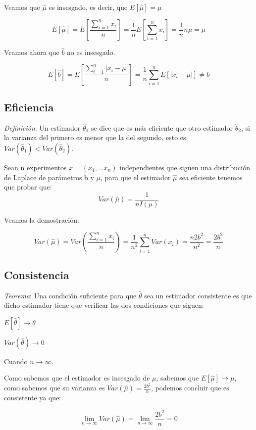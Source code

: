 \documentclass[a4paper, 10pt]{article} %
\begin{document}
Veamos que $\hat{\mu}$ es insesgado, es decir, que  $E\left[\hat{\mu}\right]=\mu$

$$E\left[\hat{\mu}\right] = E\left[\frac{\sum_{i=1}^{n}x_i}{n}\right] = \frac{1}{n}E\left[\sum_{i=1}^{n}x_i\right] = \frac{1}{n}n\mu = \mu $$

Veamos ahora que $\hat{b}$ no es insesgado. 

$$E\left[\hat{b}\right] = E\left[\frac{\sum_{i=1}^{n}|x_i - \mu|}{n}\right] = \frac{1}{n}\sum_{i=1}^{n}E\left[|x_i - \mu|\right] \neq b$$ 

\subsection{Eficiencia}
\emph{Definición}: Un estimador $\hat{\theta}_1$ se dice que es más eficiente que otro estimador
$\hat{\theta}_2$, si la varianza del primero es menor que la del segundo, esto es,  $Var(\hat{\theta}_1)<Var(\hat{\theta}_2)$.

Sean n experimentos $x=(x_1,...x_n)$ independientes que siguen una distribución de Laplace de parámetros b y $\mu$, para que el
estimador $\hat{\mu}$ sea eficiente tenemos que probar que:
$$Var(\hat{\mu})=\frac{1}{nI(\mu)}$$

Veamos la demostración: 

$$Var(\hat{\mu}) = Var\left(\frac{\sum_{i=1}^{n}x_i}{n}\right) = \frac{1}{n^2}\sum_{i=1}^{n}Var(x_i) = \frac{n 2 b^2}{n^2} =
\frac{2 b^2}{n}$$

\subsection{Consistencia}
\emph{Teorema}: Una condición suficiente para que $\hat{\theta}$ sea un estimador consistente es que
dicho estimador tiene que verificar las dos condiciones que siguen:

\begin{description}
	\item $E[\hat{\theta}] \rightarrow \theta$
	\item $Var(\hat{\theta}) \rightarrow 0$
	\item Cuando $n \rightarrow \infty$.
\end{description}

Como sabemos que el estimador es insesgado de $\mu$, sabemos que $E[\hat{\mu}] \rightarrow \mu$, como sabemos que su varianza
es $Var(\hat{\mu}) = \frac{2 b^2}{n}$, podemos concluir que es consistente ya que:

$$\lim\limits_{n \rightarrow \infty} Var(\hat{\mu}) = \lim\limits_{n \rightarrow \infty} \frac{2 b^2}{n} = 0$$
\end{document}
